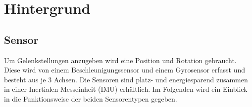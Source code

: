 \chapter{Hintergrund}
\label{ch:background}

\section{Sensor}
Um Gelenkstellungen anzugeben wird eine Position und Rotation gebraucht.
Diese wird von einem Beschleunigungssensor und einem Gyrosensor erfasst und besteht aus je 3 Achsen.
Die Sensoren sind platz- und energiesparend zusammen in einer Inertialen Messeinheit (IMU) erhältlich.
Im Folgenden wird ein Einblick in die Funktionsweise der beiden Sensorentypen gegeben.

